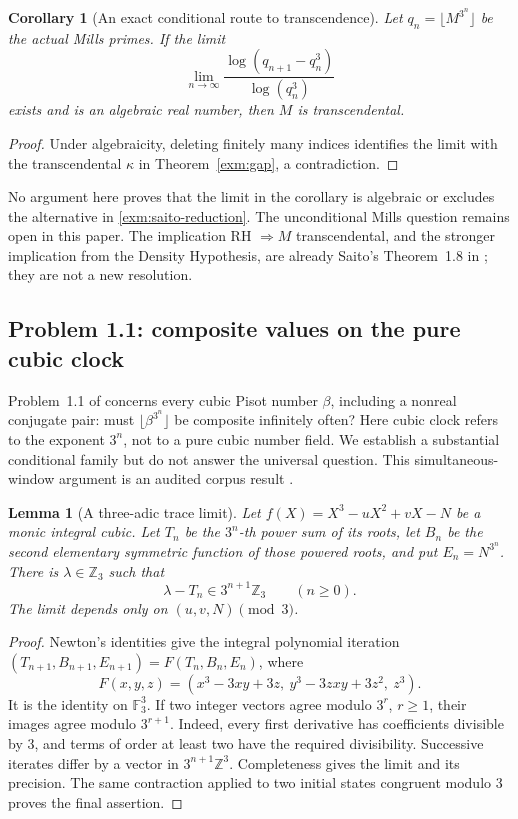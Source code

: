 \documentclass[11pt,a4paper]{article}
\numberwithin{equation}{section}
\newtheorem{lemma}[theorem]{Lemma}
\newtheorem{corollary}[theorem]{Corollary}
\theoremstyle{definition}
\theoremstyle{remark}
\begin{document}
\begin{corollary}[An exact conditional route to transcendence]
\label{exm:gap-criterion}
Let \(q_n=\lfloor M^{3^n}\rfloor\) be the actual Mills primes.
If the limit
\[
 \lim_{n\to\infty}
 \frac{\log(q_{n+1}-q_n^3)}{\log(q_n^3)}
\]
exists and is an algebraic real number, then \(M\) is
transcendental.
\end{corollary}
\begin{proof}
Under algebraicity, deleting finitely many indices identifies
the limit with the transcendental \(\kappa\) in
Theorem~\ref{exm:gap}, a contradiction.
\end{proof}

No argument here proves that the limit in the corollary is
algebraic or excludes the alternative in
\eqref{exm:saito-reduction}. The unconditional Mills question
remains open in this paper. The implication
RH \(\Rightarrow M\) transcendental, and the stronger implication
from the Density Hypothesis, are already Saito's
Theorem~1.8 in \cite{SaitoVariants}; they are not a new resolution.

\subsection{Problem 1.1: composite values on the pure cubic clock}
\label{exm:cubic}

Problem~1.1 of \cite{SaitoIntervals} concerns every cubic Pisot
number \(\beta\), including a nonreal conjugate pair:
must \(\lfloor\beta^{3^n}\rfloor\) be composite infinitely often?
Here cubic clock refers to the exponent \(3^n\), not to a
pure cubic number field. We establish a substantial conditional
family but do not answer the universal question. This
simultaneous-window argument is an audited corpus result
\cite{VMRC042}.

\begin{lemma}[A three-adic trace limit]\label{exm:three-limit}
Let \(f(X)=X^3-uX^2+vX-N\) be a monic integral cubic.
Let \(T_n\) be the \(3^n\)-th power sum of its roots,
let \(B_n\) be the second elementary symmetric function of
those powered roots, and put \(E_n=N^{3^n}\).
There is \(\lambda\in\mathbb Z_3\) such that
\[
 \lambda-T_n\in3^{n+1}\mathbb Z_3\qquad(n\ge0).
\]
The limit depends only on \((u,v,N)\pmod3\).
\end{lemma}
\begin{proof}
Newton's identities give the integral polynomial iteration
\((T_{n+1},B_{n+1},E_{n+1})=F(T_n,B_n,E_n)\), where
\[
 F(x,y,z)=(x^3-3xy+3z,\ y^3-3zxy+3z^2,\ z^3).
\]
It is the identity on \(\mathbb F_3^3\). If two
integer vectors agree modulo \(3^r\), \(r\ge1\), their
images agree modulo \(3^{r+1}\). Indeed, every first
derivative has coefficients divisible by \(3\), and terms
of order at least two have the required divisibility.
Successive iterates differ by a vector in \(3^{n+1}\mathbb Z^3\).
Completeness gives the limit and its precision. The same
contraction applied to two initial states congruent modulo
\(3\) proves the final assertion.
\end{proof}
\end{document}
